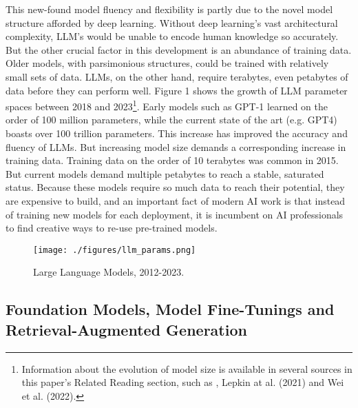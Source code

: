 \documentclass[12pt, oneside]{article}   	%
\begin{document}
This new-found model fluency and flexibility is partly due to the novel model structure afforded by deep learning.  Without deep learning’s vast architectural complexity, LLM’s would be unable to encode human knowledge so accurately.  But the other crucial factor in this development is an abundance of training data.  Older models, with parsimonious structures, could be trained with relatively small sets of data.  LLMs, on the other hand, require terabytes, even petabytes of data before they can perform well.  Figure 1 shows the growth of LLM parameter spaces between 2018 and 2023\footnote{Information about the evolution of model size is available in several sources in this paper’s Related Reading section, such as \cite{shazeer:2017, wei:2022}, Lepkin at al. (2021) and Wei et al. (2022).}.  Early models such as GPT-1 learned on the order of 100 million parameters, while the current state of the art (e.g. GPT4) boasts over 100 trillion parameters.  This increase has improved the accuracy and fluency of LLMs.  But increasing model size demands a corresponding increase in training data.  Training data on the order of 10 terabytes was common in 2015.  But current models demand multiple petabytes to reach a stable, saturated status.  Because these models require so much data to reach their potential, they are expensive to build, and an important fact of modern AI work is that instead of training new models for each deployment, it is incumbent on AI professionals to find creative ways to re-use pre-trained models.

\begin{figure}[htbp]
\begin{center}
\texttt{[image: ./figures/llm\_params.png]}
\caption{Large Language Models, 2012-2023.}
\label{default}
\end{center}
\end{figure}


\subsection{Foundation Models, Model Fine-Tunings and Retrieval-Augmented Generation}\label{section.definitions.foundation-models}

\pagebreak


\end{document}
